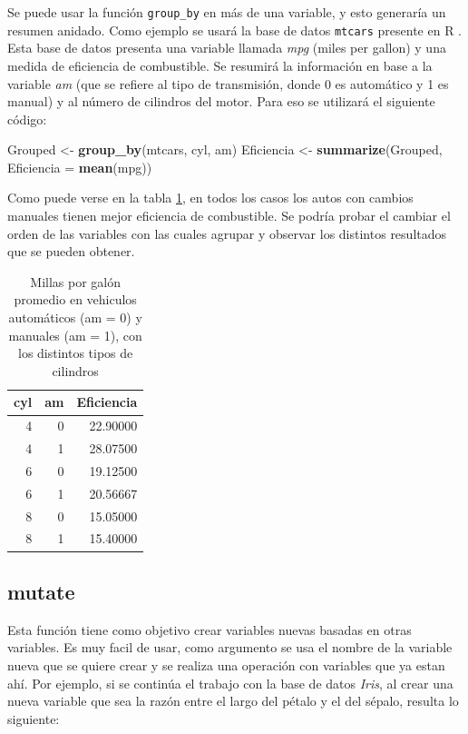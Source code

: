 \documentclass[]{book}
\newenvironment{Shaded}{\begin{snugshade}}{\end{snugshade}}
\newcommand{\DataTypeTok}[1]{\textcolor[rgb]{0.13,0.29,0.53}{#1}}
\newcommand{\KeywordTok}[1]{\textcolor[rgb]{0.13,0.29,0.53}{\textbf{#1}}}
\newcommand{\NormalTok}[1]{#1}
\newcommand{\StringTok}[1]{\textcolor[rgb]{0.31,0.60,0.02}{#1}}
\begin{document}
Se puede usar la función \texttt{group\_by} en más de una variable, y
esto generaría un resumen anidado. Como ejemplo se usará la base de
datos \texttt{mtcars} presente en R \citep{henderson1981building}. Esta
base de datos presenta una variable llamada \emph{mpg} (miles per
gallon) y una medida de eficiencia de combustible. Se resumirá la
información en base a la variable \emph{am} (que se refiere al tipo de
transmisión, donde 0 es automático y 1 es manual) y al número de
cilindros del motor. Para eso se utilizará el siguiente código:

\begin{Shaded}
\begin{Highlighting}[]
\NormalTok{Grouped <-}\StringTok{ }\KeywordTok{group_by}\NormalTok{(mtcars, cyl, am)}
\NormalTok{Eficiencia <-}\StringTok{ }\KeywordTok{summarize}\NormalTok{(Grouped, }\DataTypeTok{Eficiencia =} \KeywordTok{mean}\NormalTok{(mpg))}
\end{Highlighting}
\end{Shaded}

Como puede verse en la tabla \ref{tab:Eficienciatab}, en todos los casos
los autos con cambios manuales tienen mejor eficiencia de combustible.
Se podría probar el cambiar el orden de las variables con las cuales
agrupar y observar los distintos resultados que se pueden obtener.

\begin{table}

\caption{\label{tab:Eficienciatab}Millas por galón promedio en vehiculos automáticos (am = 0) y manuales (am = 1), con los distintos tipos de cilindros}
\centering
\begin{tabular}[t]{rrr}
\toprule
cyl & am & Eficiencia\\
\midrule
4 & 0 & 22.90000\\
4 & 1 & 28.07500\\
6 & 0 & 19.12500\\
6 & 1 & 20.56667\\
8 & 0 & 15.05000\\
8 & 1 & 15.40000\\
\bottomrule
\end{tabular}
\end{table}

\hypertarget{mutate}{%
\subsection{mutate}\label{mutate}}

Esta función tiene como objetivo crear variables nuevas basadas en otras
variables. Es muy facil de usar, como argumento se usa el nombre de la
variable nueva que se quiere crear y se realiza una operación con
variables que ya estan ahí. Por ejemplo, si se continúa el trabajo con
la base de datos \emph{Iris}, al crear una nueva variable que sea la
razón entre el largo del pétalo y el del sépalo, resulta lo siguiente:
\end{document}
